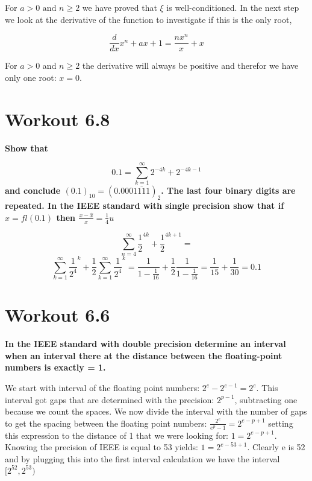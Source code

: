 \documentclass[a4paper]{article}
\begin{document}
For $a > 0 \text{ and } n \ge 2$ we have proved that $\xi$ is well-conditioned. In the next step we look at the derivative of the function to investigate if this is the only root, 

\begin{equation}
	\frac{d}{dx}x^n+ax+1 = \frac{nx^n}{x}+x 
\end{equation}

For $a>0$ and $n\ge 2$ the derivative will always be positive and therefor we have only one root: $x=0$.


\newpage
\section{Workout 6.8}
\textbf{Show that}

\begin{equation}
	0.1 = \sum_{k=1}^{\infty} 2^{-4k}+2^{-4k-1}
\end{equation}
\textbf{and conclude $(0.1)_{10} = (0.000\overline{1111})_2 $. The last four binary digits are repeated. In the IEEE standard with single precision show that if $\hat{x} = fl\left( 0.1 \right) $ then $\frac{x-\hat{x}}{x} = \frac{1}{4}u$ }

\begin{equation}
	\sum_{n=4}^{\infty} \frac{1}{2}^{4k} + \frac{1}{2}^{4k+1} =
\end{equation}
\begin{equation}
	\sum_{k=1}^{\infty} \frac{1}{2^4}^{k} + \frac{1}{2} \sum_{k=1}^{\infty}  \frac{1}{2^4}^{k} = \frac{1}{1-\frac{1}{16}} + \frac{1}{2}\frac{1}{1-\frac{1}{16}} = \frac{1}{15}+\frac{1}{30} = 0.1 
\nonumber
\end{equation}

\newpage
\section{Workout 6.6}
\textbf{In the IEEE standard with double precision determine an interval when an interval there at the distance between the floating-point numbers is exactly = 1.}

We start with interval of the floating point numbers:  $2^{e} - 2^{e-1} = 2^{e}$. This interval got gaps that are determined with the precision: $2^{p-1}$, subtracting one because we count the spaces. We now divide the interval with the number of gaps to get the spacing between the floating point numbers: $\frac{2^{e}}{e^p-1} = 2^{e-p+1}$ setting this expression to the distance of 1 that we were looking for: $1 = 2^{e-p+1}$. Knowing the precision of IEEE is equal to 53 yields: $1 = 2^{e-53+1}$. Clearly e is 52 and by plugging this into the first interval calculation we have the interval $[2^{52},2^{53})$
\end{document}
